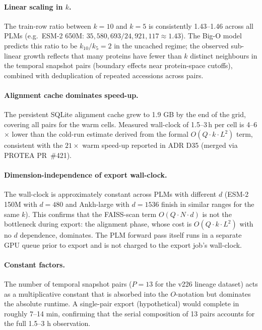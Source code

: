 \paragraph{Linear scaling in $k$.}
The train-row ratio between $k = 10$ and $k = 5$ is consistently
1.43--1.46 across all PLMs (e.g.\ ESM-2 650M: $35{,}580{,}693 /
24{,}921{,}117 \approx 1.43$). The Big-O model predicts this ratio to be
$k_{10} / k_5 = 2$ in the uncached regime; the observed sub-linear
growth reflects that many proteins have fewer than $k$ distinct neighbours
in the temporal snapshot pairs (boundary effects near protein-space cutoffs),
combined with deduplication of repeated accessions across pairs.

\paragraph{Alignment cache dominates speed-up.}
The persistent SQLite alignment cache grew to 1.9 GB by the end of the
grid, covering all pairs for the warm cells. Measured wall-clock of
1.5--3\,h per cell is 4--6$\times$ lower than the cold-run estimate
derived from the formal $O(Q \cdot k \cdot L^2)$ term, consistent with
the $21\times$ warm speed-up reported in ADR D35 (merged via PROTEA
PR~\#421).

\paragraph{Dimension-independence of export wall-clock.}
The wall-clock is approximately constant across PLMs with different $d$
(ESM-2 150M with $d = 480$ and Ankh-large with $d = 1536$ finish in
similar ranges for the same $k$). This confirms that the FAISS-scan term
$O(Q \cdot N \cdot d)$ is not the bottleneck during export: the alignment
phase, whose cost is $O(Q \cdot k \cdot L^2)$ with no $d$ dependence,
dominates. The PLM forward pass itself runs in a separate GPU queue prior
to export and is not charged to the export job's wall-clock.

\paragraph{Constant factors.}
The number of temporal snapshot pairs ($P = 13$ for the v226 lineage dataset)
acts as a multiplicative constant that is absorbed into the $O$-notation
but dominates the absolute runtime. A single-pair export (hypothetical)
would complete in roughly 7--14 min, confirming that the serial composition
of 13 pairs accounts for the full 1.5--3 h observation.
